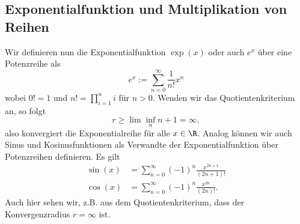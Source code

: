 \documentclass[letterpaper,10pt,english]{jupyterBook}
\begin{document}
\subsection{Exponentialfunktion und Multiplikation von Reihen}
\label{\detokenize{metrik/potenzreihen:exponentialfunktion-und-multiplikation-von-reihen}}
Wir definieren nun die Exponentialfunktion \(\exp(x)\) oder auch \(e^x\) über eine Potenzreihe als
\begin{equation*}
 e^x:= \sum_{n=0}^\infty \frac{1}{n!} x^n
\end{equation*}
wobei \(0!=1\) und \(n! = \prod_{i=1}^n i\) für \(n > 0\). Wenden wir das Quotientenkriterium an, so folgt
\begin{equation*}
 r \geq \lim\inf_n n+1 = \infty,
\end{equation*}
also konvergiert die Exponentialreihe für alle \(x \in \R\).
Analog können wir auch Sinus  und Kosinusfunktionen als Verwandte der Exponentialfunktion über Potenzreihen definieren. Es gilt
\begin{align*}
\sin(x) &= \sum_{n=0}^\infty (-1)^n \frac{x^{2n+1}}{(2n+1)!} \\
\cos(x) &= \sum_{n=0}^\infty (-1)^n \frac{x^{2n }}{(2n )!}.
\end{align*}
Auch hier sehen wir, z.B. aus dem Quotientenkriterium, dass der Konvergenzradius \(r=\infty\) ist.
\end{document}
